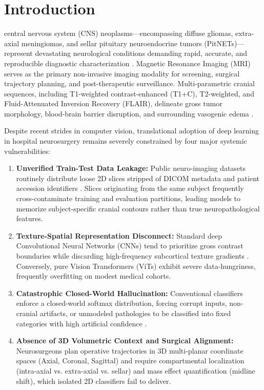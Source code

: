 \documentclass[journal,twocolumn,10pt]{IEEEtran}
\begin{document}
\IEEEpeerreviewmaketitle

\section{Introduction}
 central nervous system (CNS) neoplasms—encompassing diffuse gliomas, extra-axial meningiomas, and sellar pituitary neuroendocrine tumors (PitNETs)—represent devastating neurological conditions demanding rapid, accurate, and reproducible diagnostic characterization \cite{louis2021who}. Magnetic Resonance Imaging (MRI) serves as the primary non-invasive imaging modality for screening, surgical trajectory planning, and post-therapeutic surveillance. Multi-parametric cranial sequences, including T1-weighted contrast-enhanced (T1+C), T2-weighted, and Fluid-Attenuated Inversion Recovery (FLAIR), delineate gross tumor morphology, blood-brain barrier disruption, and surrounding vasogenic edema \cite{menze2014brats}.

Despite recent strides in computer vision, translational adoption of deep learning in hospital neurosurgery remains severely constrained by four major systemic vulnerabilities:
\begin{enumerate}
    \item \textbf{Unverified Train-Test Data Leakage:} Public neuro-imaging datasets routinely distribute loose 2D slices stripped of DICOM metadata and patient accession identifiers \cite{bhuvaji2020kaggle}. Slices originating from the same subject frequently cross-contaminate training and evaluation partitions, leading models to memorize subject-specific cranial contours rather than true neuropathological features.
    \item \textbf{Texture-Spatial Representation Disconnect:} Standard deep Convolutional Neural Networks (CNNs) tend to prioritize gross contrast boundaries while discarding high-frequency subcortical texture gradients \cite{he2016deep}. Conversely, pure Vision Transformers (ViTs) exhibit severe data-hungriness, frequently overfitting on modest medical cohorts.
    \item \textbf{Catastrophic Closed-World Hallucination:} Conventional classifiers enforce a closed-world softmax distribution, forcing corrupt inputs, non-cranial artifacts, or unmodeled pathologies to be classified into fixed categories with high artificial confidence \cite{guo2017calibration}.
    \item \textbf{Absence of 3D Volumetric Context and Surgical Alignment:} Neurosurgeons plan operative trajectories in 3D multi-planar coordinate spaces (Axial, Coronal, Sagittal) and require compartmental localization (intra-axial vs. extra-axial vs. sellar) and mass effect quantification (midline shift), which isolated 2D classifiers fail to deliver.
\end{enumerate}
\end{document}
